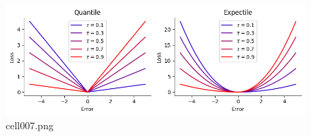 \begin{figure}[ht]
	\centering
	\includegraphics[scale=0.8, max width=\linewidth]{./fig/bayesian-brain/quantile-expectile-regression/cell007.png}
	\caption{cell007.png}
	\label{cell007.png}
\end{figure}